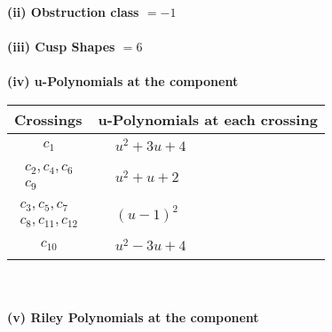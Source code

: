 \documentclass[1p]{elsarticle_modified}
\theoremstyle{definition}
\begin{document}
\flushleft \textbf{(ii) Obstruction class $= -1$}\\~\\
\flushleft \textbf{(iii) Cusp Shapes $= 6$}\\~\\
\newpage\renewcommand{\arraystretch}{1}
\flushleft \textbf{(iv) u-Polynomials at the component}\newline \\
\begin{tabular}{m{50pt}|m{274pt}}
Crossings & \hspace{64pt}u-Polynomials at each crossing \\
\hline $$\begin{aligned}c_{1}\end{aligned}$$&$\begin{aligned}
&u^2+3 u+4
\end{aligned}$\\
\hline $$\begin{aligned}c_{2},c_{4},c_{6}\\c_{9}\end{aligned}$$&$\begin{aligned}
&u^2+u+2
\end{aligned}$\\
\hline $$\begin{aligned}c_{3},c_{5},c_{7}\\c_{8},c_{11},c_{12}\end{aligned}$$&$\begin{aligned}
&(u-1)^2
\end{aligned}$\\
\hline $$\begin{aligned}c_{10}\end{aligned}$$&$\begin{aligned}
&u^2-3 u+4
\end{aligned}$\\
\hline
\end{tabular}\\~\\
\newpage\renewcommand{\arraystretch}{1}
\flushleft \textbf{(v) Riley Polynomials at the component}\newline \\
\end{document}
